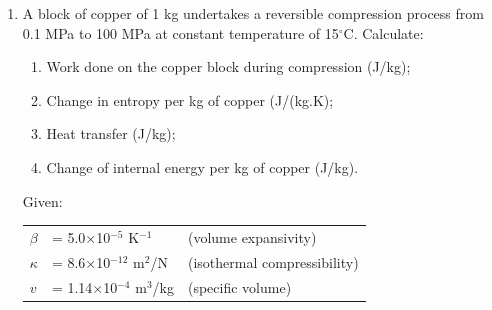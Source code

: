 \documentclass[12pts,a4paper,amsmath,amssymb,floatfix]{article}%
\begin{document}
\begin{enumerate}[label=\bfseries Problem \arabic*:]
\item A block of copper of 1 kg undertakes a reversible compression process from 0.1 MPa to 100 MPa at constant temperature of 15$^{\circ}$C. Calculate:
\begin{enumerate}
\item Work done on the copper block during compression (J/kg);
\item Change in entropy per kg of copper (J/(kg.K);
\item Heat transfer (J/kg);
\item Change of internal energy per kg of copper (J/kg).
\end{enumerate}
Given: \\
\begin{tabular}{l l l}
$\beta$   & = 5.0$\times$10$^{-5}$   K$^{-1}$   & (volume expansivity) \\
$\kappa$  & = 8.6$\times$10$^{-12}$  m$^{2}$/N  & (isothermal compressibility) \\
$v$       & = 1.14$\times$10$^{-4}$  m$^{3}$/kg & (specific volume)
\end{tabular}

\clearpage

\end{enumerate} 
%
\end{document}
